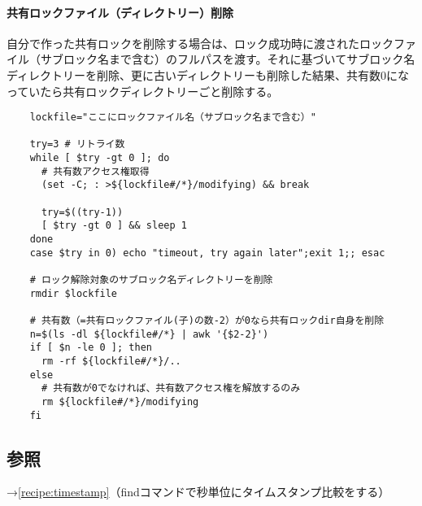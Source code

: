 \paragraph{共有ロックファイル（ディレクトリー）削除}
自分で作った共有ロックを削除する場合は、ロック成功時に渡されたロックファイル（サブロック名まで含む）のフルパスを渡す。それに基づいてサブロック名ディレクトリーを削除、更に古いディレクトリーも削除した結果、共有数0になっていたら共有ロックディレクトリーごと削除する。\\
\begin{frameboxit}{160.0mm}
\begin{verbatim}
	lockfile="ここにロックファイル名（サブロック名まで含む）"

	try=3 # リトライ数
	while [ $try -gt 0 ]; do
	  # 共有数アクセス権取得
	  (set -C; : >${lockfile#/*}/modifying) && break

	  try=$((try-1))
	  [ $try -gt 0 ] && sleep 1
	done
	case $try in 0) echo "timeout, try again later";exit 1;; esac

	# ロック解除対象のサブロック名ディレクトリーを削除
	rmdir $lockfile

	# 共有数（=共有ロックファイル(子)の数-2）が0なら共有ロックdir自身を削除
	n=$(ls -dl ${lockfile#/*} | awk '{$2-2}')
	if [ $n -le 0 ]; then
	  rm -rf ${lockfile#/*}/..
	else
	  # 共有数が0でなければ、共有数アクセス権を解放するのみ
	  rm ${lockfile#/*}/modifying
	fi
\end{verbatim}
\end{frameboxit}


\subsection*{参照}

\noindent
→\ref{recipe:timestamp}（findコマンドで秒単位にタイムスタンプ比較をする）
